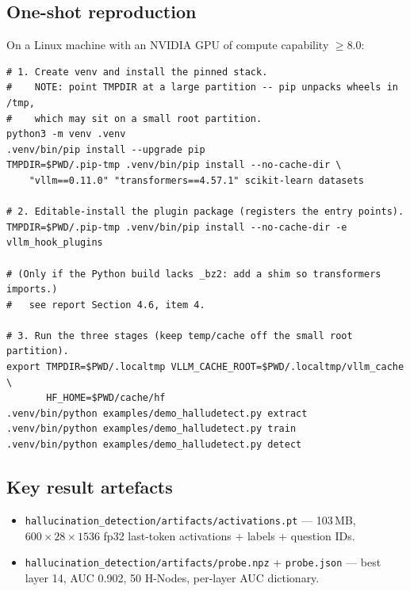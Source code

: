\documentclass[11pt]{article}
\begin{document}
\subsection{One-shot reproduction}
On a Linux machine with an NVIDIA GPU of compute capability $\ge 8.0$:
\begin{lstlisting}[style=sh]
# 1. Create venv and install the pinned stack.
#    NOTE: point TMPDIR at a large partition -- pip unpacks wheels in /tmp,
#    which may sit on a small root partition.
python3 -m venv .venv
.venv/bin/pip install --upgrade pip
TMPDIR=$PWD/.pip-tmp .venv/bin/pip install --no-cache-dir \
    "vllm==0.11.0" "transformers==4.57.1" scikit-learn datasets

# 2. Editable-install the plugin package (registers the entry points).
TMPDIR=$PWD/.pip-tmp .venv/bin/pip install --no-cache-dir -e vllm_hook_plugins

# (Only if the Python build lacks _bz2: add a shim so transformers imports.)
#   see report Section 4.6, item 4.

# 3. Run the three stages (keep temp/cache off the small root partition).
export TMPDIR=$PWD/.localtmp VLLM_CACHE_ROOT=$PWD/.localtmp/vllm_cache \
       HF_HOME=$PWD/cache/hf
.venv/bin/python examples/demo_halludetect.py extract
.venv/bin/python examples/demo_halludetect.py train
.venv/bin/python examples/demo_halludetect.py detect
\end{lstlisting}

\subsection{Key result artefacts}
\begin{itemize}
  \item \texttt{hallucination\_detection/artifacts/activations.pt} --- 103\,MB,
  $600 \times 28 \times 1536$ fp32 last-token activations + labels + question IDs.
  \item \texttt{hallucination\_detection/artifacts/probe.npz} + \texttt{probe.json} ---
  best layer 14, AUC 0.902, 50 H-Nodes, per-layer AUC dictionary.
\end{itemize}
\end{document}
